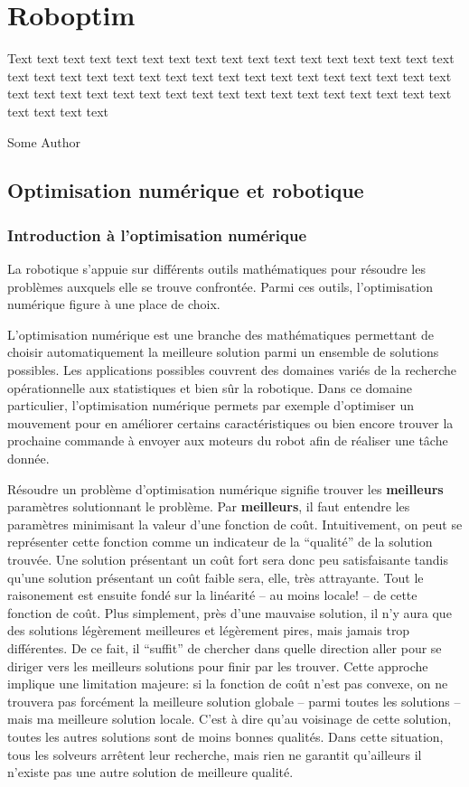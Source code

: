 \chapter{Roboptim}
\label{chap:roboptim}

\epigraph{Text text text text text text text text text text text text
  text text text text text text text text text text text text text
  text text text text text text text text text text text text text
  text text text text text text text text text text text text text
  text text text text}{Some Author}
\clearpage

\section[Optimisation]{Optimisation numérique et robotique}

\subsection{Introduction à l'optimisation numérique}

La robotique s'appuie sur différents outils mathématiques pour
résoudre les problèmes auxquels elle se trouve confrontée. Parmi ces
outils, l'optimisation numérique figure à une place de choix.


L'optimisation numérique est une branche des mathématiques permettant
de choisir automatiquement la meilleure solution parmi un ensemble de
solutions possibles. Les applications possibles couvrent des domaines
variés de la recherche opérationnelle aux statistiques et bien sûr la
robotique. Dans ce domaine particulier, l'optimisation numérique
permets par exemple d'optimiser un mouvement pour en améliorer
certains caractéristiques ou bien encore trouver la prochaine commande
à envoyer aux moteurs du robot afin de réaliser une tâche donnée.



Résoudre un problème d'optimisation numérique signifie trouver les
\textbf{meilleurs} paramètres solutionnant le problème. Par
\textbf{meilleurs}, il faut entendre les paramètres minimisant la
valeur d'une fonction de coût. Intuitivement, on peut se représenter
cette fonction comme un indicateur de la ``qualité'' de la solution
trouvée. Une solution présentant un coût fort sera donc peu
satisfaisante tandis qu'une solution présentant un coût faible sera,
elle, très attrayante. Tout le raisonement est ensuite fondé sur la
linéarité -- au moins locale! -- de cette fonction de coût. Plus
simplement, près d'une mauvaise solution, il n'y aura que des
solutions légèrement meilleures et légèrement pires, mais jamais trop
différentes. De ce fait, il ``suffit'' de chercher dans quelle
direction aller pour se diriger vers les meilleurs solutions pour
finir par les trouver. Cette approche implique une limitation majeure:
si la fonction de coût n'est pas convexe, on ne trouvera pas forcément
la meilleure solution globale -- parmi toutes les solutions -- mais ma
meilleure solution locale. C'est à dire qu'au voisinage de cette
solution, toutes les autres solutions sont de moins bonnes
qualités. Dans cette situation, tous les solveurs arrêtent leur
recherche, mais rien ne garantit qu'ailleurs il n'existe pas une autre
solution de meilleure qualité.


